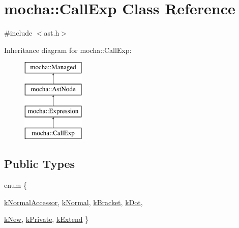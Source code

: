 \hypertarget{classmocha_1_1_call_exp}{
\section{mocha::CallExp Class Reference}
\label{classmocha_1_1_call_exp}
}


{\ttfamily \#include $<$ast.h$>$}

Inheritance diagram for mocha::CallExp:\begin{figure}[H]
\begin{center}
\leavevmode
\includegraphics[height=4.000000cm]{classmocha_1_1_call_exp}
\end{center}
\end{figure}
\subsection*{Public Types}
\begin{DoxyCompactItemize}
\item 
enum \{ \par
\hyperlink{classmocha_1_1_call_exp_a8a305224d9e8783e5d52db570638da0faf4f3592ae2b4acb488b1a48d94980fba}{kNormalAccessor}, 
\hyperlink{classmocha_1_1_call_exp_a8a305224d9e8783e5d52db570638da0fa8b5de76a6c176c0798c45c25d9a56d33}{kNormal}, 
\hyperlink{classmocha_1_1_call_exp_a8a305224d9e8783e5d52db570638da0faa9ec68ed8e03dd781222f33599dfa951}{kBracket}, 
\hyperlink{classmocha_1_1_call_exp_a8a305224d9e8783e5d52db570638da0fa05f6f2ce828edec5fed91fd4f8b1525c}{kDot}, 
\par
\hyperlink{classmocha_1_1_call_exp_a8a305224d9e8783e5d52db570638da0fa0f9895a9a11192c7a7318a6ab00cd21c}{kNew}, 
\hyperlink{classmocha_1_1_call_exp_a8a305224d9e8783e5d52db570638da0fad834166a64cdb302c9f2eb02065414db}{kPrivate}, 
\hyperlink{classmocha_1_1_call_exp_a8a305224d9e8783e5d52db570638da0fafc365536efc96bda13bd564f8dfee7c6}{kExtend}
 \}
\end{DoxyCompactItemize}
